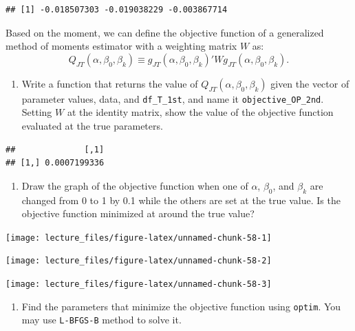 \documentclass[]{book}
\providecommand{\tightlist}{%
  \setlength{\itemsep}{0pt}\setlength{\parskip}{0pt}}
\begin{document}
\begin{verbatim}
## [1] -0.018507303 -0.019038229 -0.003867714
\end{verbatim}

Based on the moment, we can define the objective function of a
generalized method of moments estimator with a weighting matrix \(W\)
as: \[
Q_{JT}(\alpha, \beta_0, \beta_k) \equiv g_{JT}(\alpha, \beta_0, \beta_k)' W g_{JT}(\alpha, \beta_0, \beta_k).
\]

\begin{enumerate}
\def\labelenumi{\arabic{enumi}.}
\setcounter{enumi}{6}
\tightlist
\item
  Write a function that returns the value of
  \(Q_{JT}(\alpha, \beta_0, \beta_k)\) given the vector of parameter
  values, data, and \texttt{df\_T\_1st}, and name it
  \texttt{objective\_OP\_2nd}. Setting \(W\) at the identity matrix,
  show the value of the objective function evaluated at the true
  parameters.
\end{enumerate}

\begin{verbatim}
##              [,1]
## [1,] 0.0007199336
\end{verbatim}

\begin{enumerate}
\def\labelenumi{\arabic{enumi}.}
\setcounter{enumi}{7}
\tightlist
\item
  Draw the graph of the objective function when one of \(\alpha\),
  \(\beta_0\), and \(\beta_k\) are changed from 0 to 1 by 0.1 while the
  others are set at the true value. Is the objective function minimized
  at around the true value?
\end{enumerate}

\begin{center}\texttt{[image: lecture\_files/figure-latex/unnamed-chunk-58-1]} \end{center}

\begin{center}\texttt{[image: lecture\_files/figure-latex/unnamed-chunk-58-2]} \end{center}

\begin{center}\texttt{[image: lecture\_files/figure-latex/unnamed-chunk-58-3]} \end{center}

\begin{enumerate}
\def\labelenumi{\arabic{enumi}.}
\setcounter{enumi}{8}
\tightlist
\item
  Find the parameters that minimize the objective function using
  \texttt{optim}. You may use \texttt{L-BFGS-B} method to solve it.
\end{enumerate}
\end{document}
